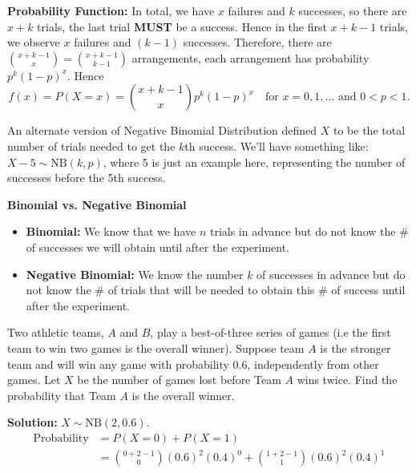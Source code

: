 \textbf{Probability Function:} In total, we have $x$ failures and $k$ successes, so there are $x+k$ trials, the last trial \textbf{MUST} be a success.
Hence in the first $x+k-1$ trials, we observe $x$ failures and $(k-1)$ successes. Therefore, there are $\binom{x+k-1}{x} = \binom{x+k-1}{k-1}$ arrangements, each arrangement has probability $p^k(1-p)^x$.
Hence \[f(x) = P(X=x) = \binom{x+k-1}{x}p^k(1-p)^x \quad \text{for $x = 0,1,\ldots$ and $0 < p < 1$}.\]

\begin{note}
    An alternate version of Negative Binomial Distribution defined $X$ to be the total number of trials needed to get the $k$th success. We'll have something like: $X-5 \sim \text{NB}(k,p)$, 
    where 5 is just an example here, representing the number of successes before the 5th success.
\end{note}

\textbf{Binomial vs. Negative Binomial}
\begin{itemize}
    \item \textbf{Binomial:} We know that we have $n$ trials in advance but do not
    know the \# of successes we will obtain until after the experiment.
    \item \textbf{Negative Binomial:} We know the number $k$ of successes in advance but do
    not know the \# of trials that will be needed to obtain this \# of success until after the experiment.
\end{itemize}


\pagebreak

\begin{example}
    Two athletic teams, $A$ and $B$, play a best-of-three series of games (i.e the first team to win two games is the overall winner). Suppose team $A$ is the
    stronger team and will win any game with probability 0.6, independently from other games. Let $X$ be the number of games lost before Team $A$ wins twice.
    Find the probability that Team $A$ is the overall winner.

    \textbf{Solution:} $X \sim \text{NB}(2, 0.6)$. \vspace{-5mm}
    \begin{align*}
        \text{Probability} &= P(X = 0) + P(X = 1) \\
        &= \binom{0+2-1}{0}(0.6)^2(0.4)^0 + \binom{1+2-1}{1}(0.6)^2(0.4)^1
    \end{align*}
\end{example}

